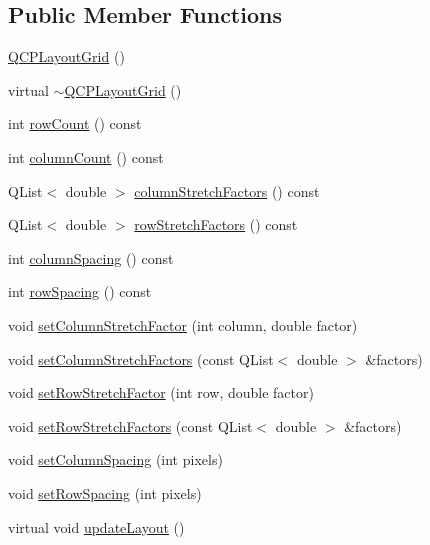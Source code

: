 \subsection*{Public Member Functions}
\begin{DoxyCompactItemize}
\item 
\hyperlink{class_q_c_p_layout_grid_ab2a4c1587dc8aed4c41c509c8d8d2a64}{Q\+C\+P\+Layout\+Grid} ()
\item 
virtual \hyperlink{class_q_c_p_layout_grid_af859f4a4db693a21056a9e615f6c4a90}{$\sim$\+Q\+C\+P\+Layout\+Grid} ()
\item 
int \hyperlink{class_q_c_p_layout_grid_af8e6c7a05864ebe610c87756c7b9079c}{row\+Count} () const 
\item 
int \hyperlink{class_q_c_p_layout_grid_ac39074eafd148b82d0762090f258189e}{column\+Count} () const 
\item 
Q\+List$<$ double $>$ \hyperlink{class_q_c_p_layout_grid_a39bd7994d00687d1b9defef6f1bda835}{column\+Stretch\+Factors} () const 
\item 
Q\+List$<$ double $>$ \hyperlink{class_q_c_p_layout_grid_a3744496abf73c8e3b464181d63bb20a7}{row\+Stretch\+Factors} () const 
\item 
int \hyperlink{class_q_c_p_layout_grid_a3de19753fdca81194458cb15156f7315}{column\+Spacing} () const 
\item 
int \hyperlink{class_q_c_p_layout_grid_abccdd33c1b284feb6df90fa02f23d9a3}{row\+Spacing} () const 
\item 
void \hyperlink{class_q_c_p_layout_grid_ae38f31a71687b9d7ee3104852528fb50}{set\+Column\+Stretch\+Factor} (int column, double factor)
\item 
void \hyperlink{class_q_c_p_layout_grid_a6c2591d1a7e2534ce036989543b49e57}{set\+Column\+Stretch\+Factors} (const Q\+List$<$ double $>$ \&factors)
\item 
void \hyperlink{class_q_c_p_layout_grid_a7b0273de5369bd93d942edbaf5b166ec}{set\+Row\+Stretch\+Factor} (int row, double factor)
\item 
void \hyperlink{class_q_c_p_layout_grid_a200b45f9c908f96ebadaa3c8d87a2782}{set\+Row\+Stretch\+Factors} (const Q\+List$<$ double $>$ \&factors)
\item 
void \hyperlink{class_q_c_p_layout_grid_a3a49272aba32bb0fddc3bb2a45a3dba0}{set\+Column\+Spacing} (int pixels)
\item 
void \hyperlink{class_q_c_p_layout_grid_aaef2cd2d456197ee06a208793678e436}{set\+Row\+Spacing} (int pixels)
\item 
virtual void \hyperlink{class_q_c_p_layout_grid_a07f8dd7d3d61d7345026621d446042a4}{update\+Layout} ()

\end{DoxyCompactItemize}
